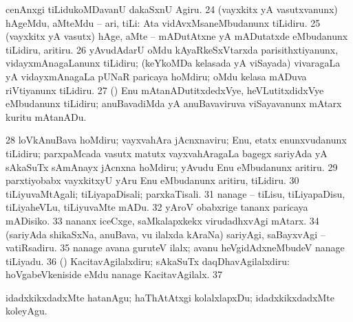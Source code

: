 {{ cenAnxgi tiLidukoMDavanU dakaSxnU Agiru. 
\num{24}  (vayxkitx yA vasutxvanunx) hAgeMdu, aMteMdu -- ari, tiLi:  Ata vidAvxMsaneMbudanunx tiLidiru. 
\num{25}  (vayxkitx yA vasutx) hAge, aMte -- mADutAtxne yA mADutatxde eMbudanunx tiLidiru, aritiru. 
\num{26}  yAvudAdarU oMdu kAyaRkeSxVtarxda parisithxtiyanunx, vidayxmAnagaLanunx tiLidiru;
(keYkoMDa kelasada yA viSayada) vivaragaLa yA vidayxmAnagaLa pUNaR paricaya hoMdiru; oMdu kelasa mADuva riVtiyanunx tiLidiru. 
\num{27} 
(\AmA) Enu mAtanADutitxdedxVye, heVLutitxdidxVye eMbudanunx tiLidiru; anuBavadiMda yA anuBavaviruva viSayavanunx mAtarx kuritu mAtanADu. 
\num{28}  loVkAnuBava hoMdiru; vayxvahAra jAcnxnaviru; Enu, etatx enunxvudanunx tiLidiru; parxpaMcada vasutx matutx vayxvahAragaLa bagegx sariyAda yA sAkaSuTx sAmAnayx jAcnxna hoMdiru; yAvudu Enu eMbudanunx aritiru. 
\num{29}  parxtiyobabx vayxkitxyU yAru Enu eMbudanunx aritiru, tiLidiru.
\num{30}  tiLiyuvaMtAgali; tiLiyapaDisali; parxkaTisali. 
\num{31}  nanage -- tiLisu, tiLiyapaDisu, tiLiyaheVLu, tiLiyuvaMte mADu. 
\num{32}  yAroV obabxrige tananx
paricaya mADisiko. 
\num{33}  nananx iceCxge, saMkalapxkekx virudadhxvAgi mAtarx. 
\num{34}  (sariyAda shikaSxNa, anuBava, \mo vu ilalxda kAraNa) sariyAgi, saBayxvAgi -- vatiRsadiru. 
\num{35}  nanage avana guruteV ilalx; avanu heVgidAdxneMbudeV nanage  tiLiyadu.
\num{36}  (\AmA) KacitavAgilalxdiru; sAkaSuTx daqDhavAgilalxdiru:
 hoVgabeVkeniside eMdu nanage KacitavAgilalx. 
\num{37}  

 idadxkikxdadxMte hatanAgu;
haThAtAtxgi kolalxlapxDu; idadxkikxdadxMte koleyAgu. 

}}
